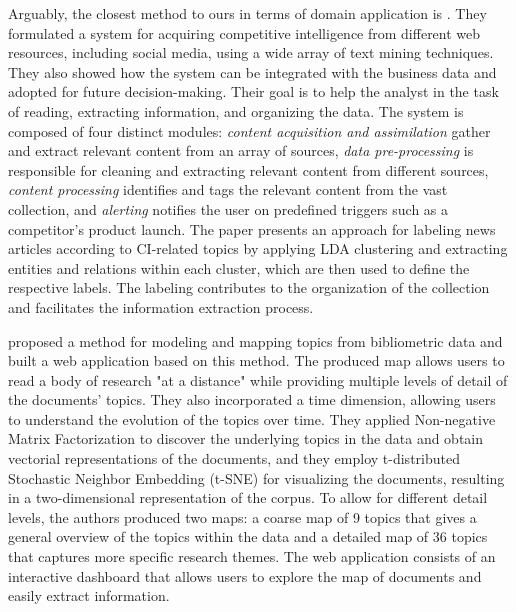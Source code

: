 \documentclass[a4paper]{article}
\begin{document}
Arguably, the closest method to ours in terms of domain application is \citet{dey2011}. They formulated a system for acquiring competitive intelligence from different web resources, including social media, using a wide array of text mining techniques. They also showed how the system can be integrated with the business data and adopted for future decision-making. Their goal is to help the analyst in the task of reading, extracting information, and organizing the data. The system is composed of four distinct modules: \emph{content acquisition and assimilation} gather and extract relevant content from an array of sources, \emph{data pre-processing} is responsible for cleaning and extracting relevant content from different sources, \emph{content processing} identifies and tags the relevant content from the vast collection, and \emph{alerting} notifies the user on predefined triggers such as a competitor's product launch. The paper presents an approach for labeling news articles according to CI-related topics by applying LDA clustering and extracting entities and relations within each cluster, which are then used to define the respective labels. The labeling contributes to the organization of the collection and facilitates the information extraction process.

\citep{lafia2021a} proposed a method for modeling and mapping topics from bibliometric data and built a web application based on this method. The produced map allows users to read a body of research "at a distance" while providing multiple levels of detail of the documents' topics. They also incorporated a time dimension, allowing users to understand the evolution of the topics over time. They applied Non-negative Matrix Factorization \citep{lee1999} to discover the underlying topics in the data and obtain vectorial representations of the documents, and they employ t-distributed Stochastic Neighbor Embedding (t-SNE) \citep{vandermaaten2008} for visualizing the documents, resulting in a two-dimensional representation of the corpus. To allow for different detail levels, the authors produced two maps: a coarse map of 9 topics that gives a general overview of the topics within the data and a detailed map of 36 topics that captures more specific research themes. The web application consists of an interactive dashboard that allows users to explore the map of documents and easily extract information.
\end{document}
